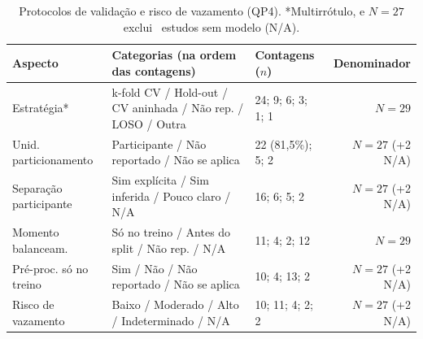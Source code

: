 \begin{table}[htbp]
\centering
\caption{Protocolos de validação e risco de vazamento (QP4). *Multirrótulo, e $N=27$ exclui \nNaoAplicaveisVaz\ estudos sem modelo (N/A).}
\label{tab:validacao}
{\scriptsize
\setlength{\tabcolsep}{3.2pt}
\begin{tabular}{@{}l l l r@{}}
\toprule
\textbf{Aspecto} & \textbf{Categorias (na ordem das contagens)} & \textbf{Contagens ($n$)} & \textbf{Denominador} \\
\midrule
Estratégia* & k-fold CV / Hold-out / CV aninhada / Não rep. / LOSO / Outra & 24; 9; 6; 3; 1; 1 & $N=29$ \\
Unid. particionamento & Participante / Não reportado / Não se aplica & 22 (81,5\%); 5; 2 & $N=27$ (+2 N/A) \\
Separação participante & Sim explícita / Sim inferida / Pouco claro / N/A & 16; 6; 5; 2 & $N=27$ (+2 N/A) \\
Momento balanceam. & Só no treino / Antes do split / Não rep. / N/A & 11; 4; 2; 12 & $N=29$ \\
Pré-proc. só no treino & Sim / Não / Não reportado / Não se aplica & 10; 4; 13; 2 & $N=27$ (+2 N/A) \\
Risco de vazamento & Baixo / Moderado / Alto / Indeterminado / N/A & 10; 11; 4; 2; 2 & $N=27$ (+2 N/A) \\
\bottomrule
\end{tabular}
}
\end{table}
